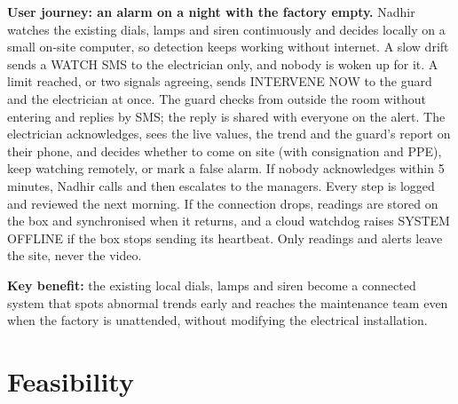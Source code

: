 \documentclass[10pt]{article}
\newcommand{\subhead}[1]{\par\vspace{4pt}{\normalsize\bfseries\color{accent}#1}\par\vspace{2pt}}
\begin{document}
\vspace{-2pt}
\textbf{User journey: an alarm on a night with the factory empty.}
Nadhir watches the existing dials, lamps and siren continuously and decides locally on a small on-site computer, so detection keeps working without internet.
A slow drift sends a WATCH SMS to the electrician only, and nobody is woken up for it.
A limit reached, or two signals agreeing, sends INTERVENE NOW to the guard and the electrician at once.
The guard checks from outside the room without entering and replies by SMS; the reply is shared with everyone on the alert.
The electrician acknowledges, sees the live values, the trend and the guard's report on their phone, and decides whether to come on site (with consignation and PPE), keep watching remotely, or mark a false alarm.
If nobody acknowledges within 5 minutes, Nadhir calls and then escalates to the managers.
Every step is logged and reviewed the next morning. If the connection drops, readings are stored on the box and synchronised when it returns, and a cloud watchdog raises SYSTEM OFFLINE if the box stops sending its heartbeat. Only readings and alerts leave the site, never the video.

\textbf{Key benefit:} the existing local dials, lamps and siren become a connected system that spots abnormal trends early and reaches the maintenance team even when the factory is unattended, without modifying the electrical installation.

\newpage
\section{Feasibility}

\subhead{Tools and technologies}
\end{document}
